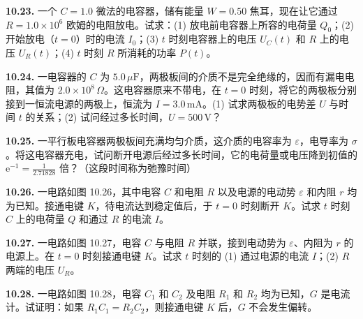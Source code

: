 \textbf{10.23.} 一个 $C = 1.0$ 微法的电容器，储有能量 $W = 0.50$ 焦耳，现在让它通过 $R = 1.0 \times 10^6$ 欧姆的电阻放电。试求：(1) 放电前电容器上所容的电荷量 $Q_0$；(2) 开始放电（$t = 0$）时的电流 $I_0$；(3) $t$ 时刻电容器上的电压 $U_C(t)$ 和 $R$ 上的电压 $U_R(t)$；(4) $t$ 时刻 $R$ 所消耗的功率 $P(t)$。

\vfill
\newpage

\textbf{10.24.} 一电容器的 $C$ 为 $5.0\,\mu\mathrm{F}$，两极板间的介质不是完全绝缘的，因而有漏电电阻，其值为 $2.0 \times 10^8\,\Omega$。这电容器原来不带电，在 $t = 0$ 时刻，将它的两极板分别接到一恒流电源的两极上，恒流为 $I = 3.0\,\mathrm{mA}$。(1) 试求两极板的电势差 $U$ 与时间 $t$ 的关系；(2) 试问经过多长时间，$U = 500\,\mathrm{V}$？

\vfill
\newpage

\textbf{10.25.} 一平行板电容器两极板间充满均匀介质，这介质的电容率为 $\varepsilon$，电导率为 $\sigma$。将这电容器充电，试问断开电源后经过多长时间，它的电荷量或电压降到初值的 $\displaystyle \mathrm{e}^{-1} = \frac{1}{2.71828}$ 倍？（这段时间称为弛豫时间）

\vfill
\newpage

\textbf{10.26.} 一电路如图 10.26，其中电容 $C$ 和电阻 $R$ 以及电源的电动势 $\varepsilon$ 和内阻 $r$ 均为已知。接通电键 $K$，待电流达到稳定值后，于 $t = 0$ 时刻断开 $K$。试求 $t$ 时刻 $C$ 上的电荷量 $Q$ 和通过 $R$ 的电流 $I$。

\begin{center}
\end{center}

\vfill
\newpage

\textbf{10.27.} 一电路如图 10.27，电容 $C$ 与电阻 $R$ 并联，接到电动势为 $\varepsilon$、内阻为 $r$ 的电源上。在 $t = 0$ 时刻接通电键 $K$。试求 $t$ 时刻的 (1) 通过电源的电流 $I$；(2) $R$ 两端的电压 $U_R$。

\begin{center}
\end{center}

\vfill
\newpage

\textbf{10.28.} 一电路如图 10.28，电容 $C_1$ 和 $C_2$ 及电阻 $R_1$ 和 $R_2$ 均为已知，$G$ 是电流计。试证明：如果 $R_1 C_1 = R_2 C_2$，则接通电键 $K$ 后，$G$ 不会发生偏转。

\begin{center}
\end{center}

